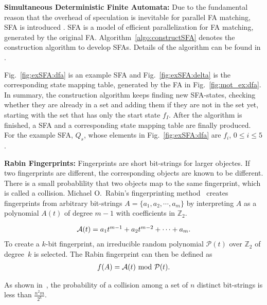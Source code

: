\documentclass[10pt, conference, compsocconf]{IEEEtran}
\newcommand\StateSet[1][{}]{\ensuremath{Q_{#1}}}
\begin{document}
{\bf Simultaneous Deterministic Finite Automata:}
Due to the fundamental reason that the overhead of speculation is
inevitable for parallel FA matching, SFA is introduced
\cite{Sinya2013}. SFA is a model of efficient parallelization for FA
matching, generated by the original FA. Algorithm~\ref{algo:constructSFA} denotes the
construction algorithm to develop SFAs. Details of the algorithm can be found in \cite{Sinya2013}.

Fig.~\ref{fig:exSFA:dfa} is an example SFA and
Fig.~\ref{fig:exSFA:delta} is the corresponding state mapping table,
generated by the FA in Fig.~\ref{fig:mot_ex:dfa}.
In summary, the construction algorithm keeps finding new SFA-states, checking
whether they are already in a set and adding them if they are not in
the set yet, starting with the set that has only the start state $f_I$.
After the algorithm is finished, a SFA and a corresponding state mapping
table are finally
produced. For the example SFA, $\StateSet[s]$, whose elements in
Fig.~\ref{fig:exSFA:dfa} are $f_i$, $0\le i \le5$.


{\bf Rabin Fingerprints:}
Fingerprints are short bit-strings for larger objectes. If two
fingerprints are different, the corresponding objects are known
to be different. There is a small probablility that two
objects map to the same fingerprint, which is called a collision.
Michael O.~Rabin's fingerprinting method~\cite{Rabin81,Broder93}
creates fingerprints from arbitrary
bit-strings
$A=\{a_1,a_2,\cdots,a_m\}$ by interpreting $A$ as
a polynomial $A(t)$ of degree $m-1$ with coefficients
in $\mathbb{Z}_2$. 

\begin{equation}
\centering
\begin{tabular}{c}
    $\mathcal{A}(t)=a_1t^{m-1}+a_2t^{m-2}+\cdots+a_m.$
\end{tabular}
\label{eq:inputA}
\end{equation}
To create a $k$-bit fingerprint, an irreducible random polynomial
$\mathcal{P}(t)$ over $\mathbb{Z}_2$ of degree~$k$ is selected.
The Rabin fingerprint can then be defined as 
\begin{equation}
\centering
\begin{tabular}{c}
    $f(A)=\mathcal{A}(t)$~mod~$\mathcal{P}(t).$ \\
\end{tabular}
\label{eq:rabin}
\end{equation}

\noindent As shown in~\cite{Broder93}, the probability of a collision among a
set of $n$ distinct bit-strings is less than $\frac{n^2m}{2^k}$.
\end{document}
